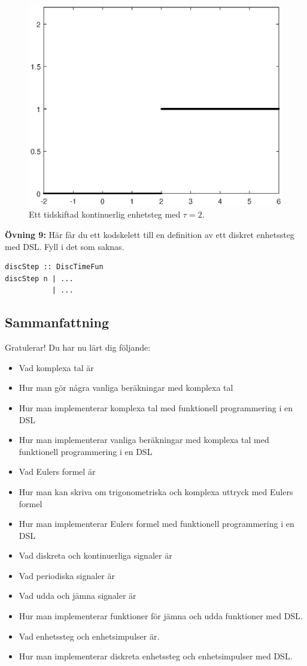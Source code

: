 \documentclass{article}
\begin{document}
\begin{figure}[ht]
\centerline{\includegraphics[scale=0.50]{shiftedHeavy.eps}}
\caption{Ett tidskiftad kontinuerlig enhetsteg med $\tau = 2$.}
\label{}
\end{figure}

\textbf{Övning 9:} Här får du ett kodskelett till en definition av ett
diskret enhetssteg med DSL. Fyll i det som saknas.
\begin{verbatim}
discStep :: DiscTimeFun
discStep n | ...
           | ...
\end{verbatim}
\newpage
\subsection{Sammanfattning}
Gratulerar! Du har nu lärt dig följande:
\begin{itemize}
\item Vad komplexa tal är
\item Hur man gör några vanliga beräkningar med komplexa tal
\item Hur man implementerar komplexa tal med funktionell programmering i en DSL
\item Hur man implementerar vanliga beräkningar med komplexa tal med
  funktionell programmering i en DSL
\item Vad Eulers formel är
\item Hur man kan skriva om trigonometriska och komplexa uttryck med Eulers formel
\item Hur man implementerar Eulers formel med funktionell programmering i en DSL
\item Vad diskreta och kontinuerliga signaler är
\item Vad periodiska signaler är
\item Vad udda och jämna signaler är
\item Hur man implementerar funktioner för jämna och udda funktioner med DSL.
\item Vad enhetssteg och enhetsimpulser är.
\item Hur man implementerar diskreta enhetssteg och enhetsimpulser med DSL.
\end{itemize}
\end{document}

